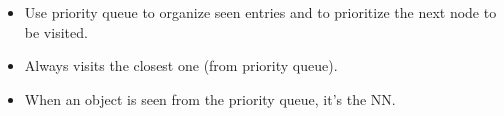\begin{multicols}{2}
\begin{itemize}
\begin{itemize}
    \begin{itemize}
        \item
      Use priority queue to organize seen entries and to prioritize the
      next node to be visited.
    \item
      Always visits the closest one (from priority queue).
    \item
      When an object is seen from the priority queue, it's the NN.
    \end{itemize}
  \end{itemize}
\end{itemize}
\end{multicols}
